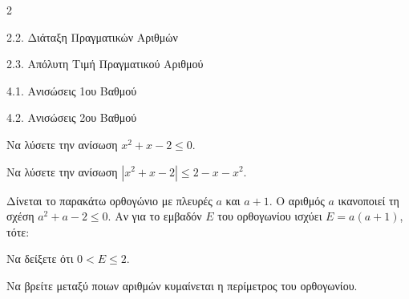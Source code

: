 \begin{ylh}{2}
    \item 2.2. Διάταξη Πραγματικών Αριθμών
    \item 2.3. Απόλυτη Τιμή Πραγματικού Αριθμού
    \item 4.1. Ανισώσεις 1ου Βαθμού
    \item 4.2. Ανισώσεις 2ου Βαθμού
\end{ylh}

\begin{alist}
\item Να λύσετε την ανίσωση $x^2 + x - 2 \leq 0$.
\item Να λύσετε την ανίσωση $|x^2 + x - 2| \leq 2 - x - x^2$.
\item Δίνεται το παρακάτω ορθογώνιο με πλευρές $a$ και $a + 1$. Ο αριθμός $a$ ικανοποιεί τη σχέση $a^2 + a - 2 \leq 0$. Αν για το εμβαδόν $E$ του ορθογωνίου ισχύει $E = a(a + 1)$, τότε:
\begin{center}
\end{center}
\begin{rlist}
\item Να δείξετε ότι $0 < E \leq 2$.
\item Να βρείτε μεταξύ ποιων αριθμών κυμαίνεται η περίμετρος του ορθογωνίου.
\end{rlist}
\end{alist}


